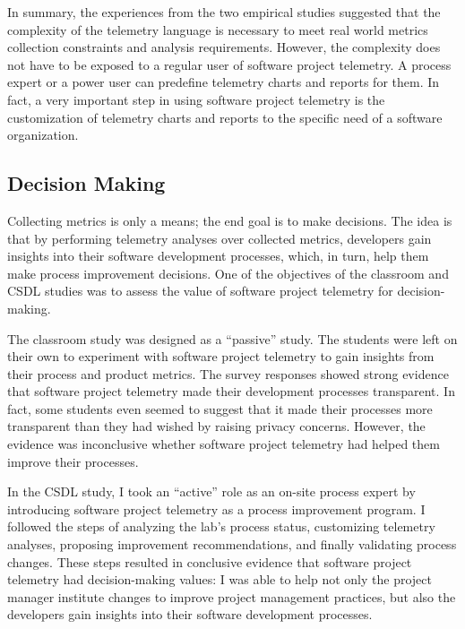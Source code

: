 In summary, the experiences from the two empirical studies suggested that the complexity of the telemetry language is necessary to meet real world metrics collection constraints and analysis requirements. However, the complexity does not have to be exposed to a regular user of software project telemetry. A process expert or a power user can predefine telemetry charts and reports for them. In fact, a very important step in using software project telemetry is the customization of telemetry charts and reports to the specific need of a software organization.





\subsection{Decision Making}

Collecting metrics is only a means; the end goal is to make decisions. The idea is that by performing telemetry analyses over collected metrics, developers gain insights into their software development processes, which, in turn, help them make process improvement decisions. One of the objectives of the classroom and CSDL studies was to assess the value of software project telemetry for decision-making.

The classroom study was designed as a ``passive'' study. The students were left on their own to experiment with software project telemetry to gain insights from their process and product metrics. The survey responses showed strong evidence that software project telemetry made their development processes transparent. In fact, some students even seemed to suggest that it made their processes more transparent than they had wished by raising privacy concerns. However, the evidence was inconclusive whether software project telemetry had helped them improve their processes.

In the CSDL study, I took an ``active'' role as an on-site process expert by introducing software project telemetry as a process improvement program. I followed the steps of analyzing the lab's process status, customizing telemetry analyses, proposing improvement recommendations, and finally validating process changes. These steps resulted in conclusive evidence that software project telemetry had decision-making values: I was able to help not only the project manager institute changes to improve project management practices, but also the developers gain insights into their software development processes.

